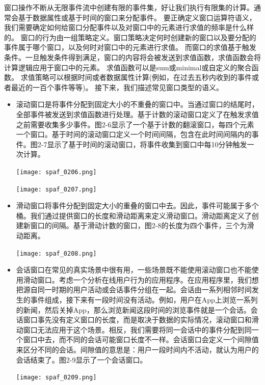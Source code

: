 \documentclass[oneside]{ctexbook}
\begin{document}
窗口操作不断从无限事件流中创建有限的事件集，好让我们执行有限集的计算。通常会基于数据属性或基于时间的窗口来分配事件。
要正确定义窗口运算符语义，我们需要确定如何给窗口分配事件以及对窗口中的元素进行求值的频率是什么样的。
窗口的行为由一组策略定义。窗口策略决定何时创建新的窗口以及要分配的事件属于哪个窗口，以及何时对窗口中的元素进行求值。
而窗口的求值基于触发条件。一旦触发条件得到满足，窗口的内容将会被发送到求值函数，求值函数会将计算逻辑应用于窗口中的元素。
求值函数可以是sum或minimal或自定义的聚合函数。
求值策略可以根据时间或者数据属性计算(例如，在过去五秒内收到的事件或者最近的一百个事件等等)。
接下来，我们描述常见窗口类型的语义。

\begin{itemize}
  \item 滚动窗口是将事件分配到固定大小的不重叠的窗口中。当通过窗口的结尾时，全部事件被发送到求值函数进行处理。基于计数的滚动窗口定义了在触发求值之前需要收集多少事件。图2-6显示了一个基于计数的翻滚窗口，每四个元素一个窗口。基于时间的滚动窗口定义一个时间间隔，包含在此时间间隔内的事件。图2-7显示了基于时间的滚动窗口，将事件收集到窗口中每10分钟触发一次计算。

  \texttt{[image: spaf\_0206.png]}

  \texttt{[image: spaf\_0207.png]}

  \item 滑动窗口将事件分配到固定大小的重叠的窗口中去。因此，事件可能属于多个桶。我们通过提供窗口的长度和滑动距离来定义滑动窗口。滑动距离定义了创建新窗口的间隔。基于滑动计数的窗口，图2-8的长度为四个事件，三个为滑动距离。

  \texttt{[image: spaf\_0208.png]}

  \item 会话窗口在常见的真实场景中很有用，一些场景既不能使用滚动窗口也不能使用滑动窗口。考虑一个分析在线用户行为的应用程序。在应用程序里，我们想把源自同一时期的用户活动或会话事件分组在一起。会话由一系列相邻时间发生的事件组成，接下来有一段时间没有活动。例如，用户在App上浏览一系列的新闻，然后关掉App，那么浏览新闻这段时间的浏览事件就是一个会话。会话窗口事先没有定义窗口的长度，而是取决于数据的实际情况，滚动窗口和滑动窗口无法应用于这个场景。相反，我们需要将同一会话中的事件分配到同一个窗口中去，而不同的会话可能窗口长度不一样。会话窗口会定义一个间隙值来区分不同的会话。间隙值的意思是：用户一段时间内不活动，就认为用户的会话结束了。图2-9显示了一个会话窗口。

  \texttt{[image: spaf\_0209.png]}

\end{itemize}
\end{document}
